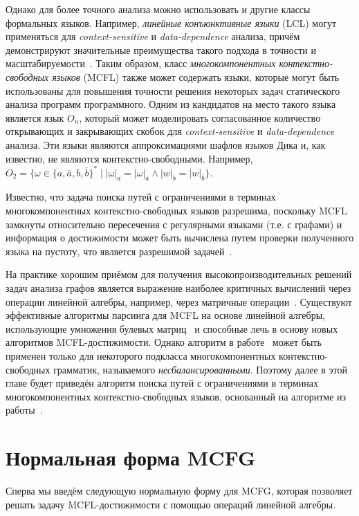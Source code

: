 Однако для более точного анализа можно использовать и другие классы формальных языков. Например, \textit{линейные конъюнктивные языки} (LCL) могут применяться для \textit{context-sensitive} и \textit{data-dependence} анализа, причём демонстрируют значительные преимущества такого подхода в точности и масштабируемости~\cite{zhang2017context}. Таким образом, класс \textit{многокомпонентных контекстно-свободных языков} (MCFL) также может содержать языки, которые могут быть использованы для повышения точности решения некоторых задач статического анализа программ программного. Одним из кандидатов на место такого языка является язык $O_n$, который может моделировать согласованное количество открывающих и закрывающих скобок для \textit{context-sensitive} и \textit{data-dependence} анализа. Эти языки являются аппроксимациями шафлов языков Дика и, как известно, не являются контекстно-свободными. Например, $O_2=\{\omega \in \{a,\overline{a},b,\overline{b}\}^* \mid |\omega|_a=|\omega|_{\overline{a}} \wedge |w|_b=|w|_{\overline{b}}\}$.


Известно, что задача поиска путей с ограничениями в терминах многокомпонентных контекстно-свободных языков разрешима, поскольку MCFL замкнуты относительно пересечения с регулярными языками (т.е. с графами) и информация о достижимости может быть вычислена путем проверки полученного языка на пустоту, что является разрешимой задачей~\cite{seki1991multiple}.

На практике хорошим приёмом для получения высокопроизводительных решений задач анализа графов является выражение наиболее критичных вычислений через операции линейной алгебры, например, через матричные операции~\cite{doi:10.1137/1.9780898719918}. Существуют эффективные алгоритмы парсинга для MCFL на основе линейной алгебры, использующие умножения булевых матриц~\cite{nakanishi1997efficient,cohen2016parsing} и способные лечь в основу новых алгоритмов MCFL-достижимости. Однако алгоритм в работе~\cite{cohen2016parsing} может быть применен только для некоторого подкласса многокомпонентных контекстно-свободных грамматик, называемого \textit{несбалансированными}. Поэтому далее в этой главе будет приведён алгоритм поиска путей с ограничениями в терминах многокомпонентных контекстно-свободных языков, основанный на алгоритме из работы~\cite{nakanishi1997efficient}.


\section{Нормальная форма MCFG}\label{normalformmcfg}
Сперва мы введём следующую нормальную форму для MCFG, которая позволяет решать задачу MCFL-достижимости с помощью операций линейной алгебры.


